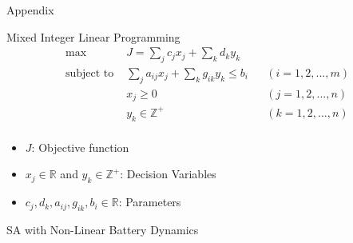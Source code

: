 \documentclass[aspectratio=169,dvipsnames]{beamer}
\begin{document}
\appendix
\begin{frame}[label={sec:org8282f9e}]{}
\centering
\Huge Appendix
\end{frame}

\begin{frame}[label={sec:orgc8a0e19}]{Mixed Integer Linear Programming}
\begin{align*}
\text{max }        &J = \sum_j c_j x_j + \sum_k d_k y_k&         &               \\
\text{subject to } &\sum_j a_{ij} x_j + \sum_k g_{ik} y_k \le b_i&  &(i = 1,2,...,m)\\
                  &x_j \ge 0&                              &(j = 1,2,...,n)\\
                  &y_k \in \mathbb{Z^+}&                   &(k = 1,2,...,n)\\
\end{align*}

\begin{itemize}
\item \(J\): Objective function
\item \(x_j \in \mathbb{R}\) and \(y_k \in \mathbb{Z}^+\): Decision Variables
\item \(c_j, d_k, a_{ij}, g_{ik}, b_i \in \mathbb{R}\): Parameters
\end{itemize}
\end{frame}


\begin{frame}[label={sec:org97c1d5c}]{}
\centering
\Huge SA with Non-Linear Battery Dynamics
\end{frame}
\end{document}
